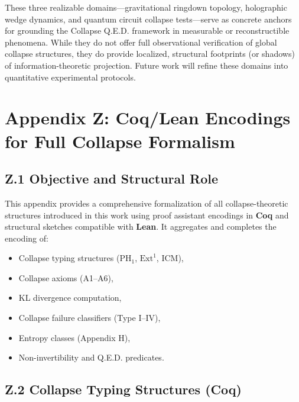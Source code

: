 \documentclass[11pt]{article}
\begin{document}
These three realizable domains—gravitational ringdown topology, holographic wedge dynamics, and quantum circuit collapse tests—serve as concrete anchors for grounding the Collapse Q.E.D. framework in measurable or reconstructible phenomena. While they do not offer full observational verification of global collapse structures, they do provide localized, structural footprints (or shadows) of information-theoretic projection. Future work will refine these domains into quantitative experimental protocols.



\section*{Appendix Z: Coq/Lean Encodings for Full Collapse Formalism}

\subsection*{Z.1 Objective and Structural Role}

This appendix provides a comprehensive formalization of all collapse-theoretic structures introduced in this work using proof assistant encodings in \textbf{Coq} and structural sketches compatible with \textbf{Lean}. It aggregates and completes the encoding of:

\begin{itemize}
  \item Collapse typing structures (\( \mathrm{PH}_1 \), \( \mathrm{Ext}^1 \), ICM),
  \item Collapse axioms (A1–A6),
  \item KL divergence computation,
  \item Collapse failure classifiers (Type I–IV),
  \item Entropy classes (Appendix H),
  \item Non-invertibility and Q.E.D. predicates.
\end{itemize}

\subsection*{Z.2 Collapse Typing Structures (Coq)}
\end{document}

